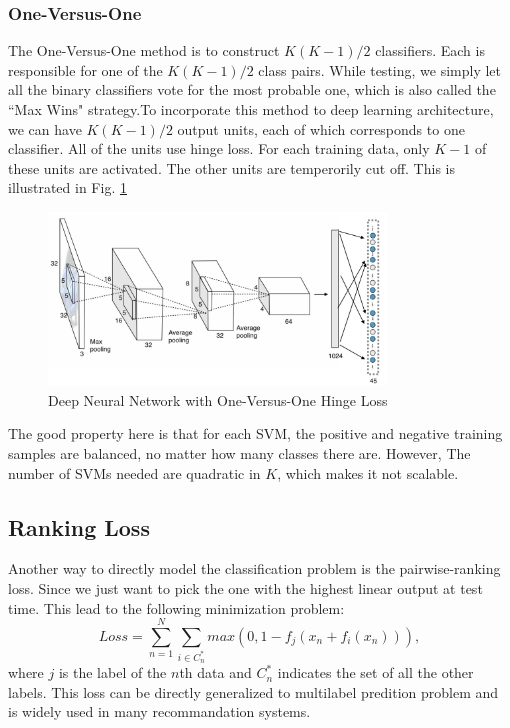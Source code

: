 \documentclass{article} %
\begin{document}
\subsubsection{One-Versus-One}
The One-Versus-One method is to construct $K(K-1)/2$ classifiers. Each is responsible for one of the $K(K-1)/2$ class pairs. While testing, we simply let all the binary classifiers vote for the most probable one, which is also called the ``Max Wins" strategy.To incorporate this method to deep learning architecture, we can have $K(K-1)/2$ output units, each of which corresponds to one classifier. All of the units use hinge loss. For each training data, only $K-1$ of these units
are activated. The other units are temperorily cut off. This is illustrated in Fig. \ref{mcsvm} 
\begin{figure}
\centering 
\includegraphics[width=0.8\textwidth]{MCSVM.png}
\caption{ Deep Neural Network with One-Versus-One Hinge Loss}
\label{mcsvm} 
\end{figure}



The good property here is that for each SVM, the positive and negative training samples are balanced, no matter how many classes there are. However, The number of SVMs needed are quadratic in $K$, which makes it not scalable.

\subsection{Ranking Loss}
Another way to directly model the classification problem is the pairwise-ranking loss. Since we just want to pick the one with the highest linear output at test time. This lead to the following minimization problem:
\begin{equation}
Loss = \sum_{n=1}^{N}\sum_{i \in C_{n}^{*}}max(0, 1-f_{j}(x_{n}+f_{i}(x_{n}))),
\end{equation}
where $j$ is the label of the $n$th data and $C_{n}^{*}$ indicates the set of all the other labels. This loss can be directly generalized to multilabel predition problem and is widely used in many recommandation systems. 
\end{document}
